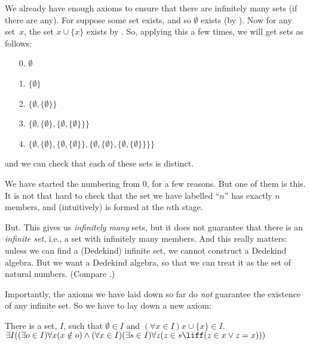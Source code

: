 \documentclass[../../../include/open-logic-section]{subfiles}
\begin{document}

We already have enough axioms to ensure that there are infinitely many
sets (if there are any). For suppose some set exists, and so
$\emptyset$ exists (by ). Now for
any set~$x$, the set $x \cup \{x\}$ exists by
. So, applying this a few
times, we will get sets as follows:
\begin{enumerate}
	\item[0.] $\emptyset$ %
	\item[1.] $ \{\emptyset\}$ %
	\item[2.] $\{\emptyset, \{\emptyset\}\}$ %
	\item[3.] $\{\emptyset, \{\emptyset\}, \{\emptyset, \{\emptyset\}\}\}$ %
	\item[4.] $\{\emptyset, \{\emptyset\}, \{\emptyset, \{\emptyset\}\}, \{\emptyset, \{\emptyset\}, \{\emptyset, \{\emptyset\}\}\}\}$%
\end{enumerate}
and we can check that each of these sets is distinct. 

We have started the numbering from $0$, for a few reasons. But one of
them is this. It is not that hard to check that the set we have
labelled ``$n$'' has exactly $n$ members, and (intuitively) is formed
at the $n$th stage. 

But. This gives us \emph{infinitely many} sets, but it does not
guarantee that there is an \emph{infinite set}, i.e., a set with
infinitely many members. And this really matters: unless we can find a
(Dedekind) infinite set, we cannot construct a Dedekind algebra. But
we want a Dedekind algebra, so that we can treat it as the set of
natural numbers. (Compare
.)

Importantly, the axioms we have laid down so far do \emph{not}
guarantee the existence of any infinite set. So we have to lay down a
new axiom:

\begin{axiom}[Infinity]
There is a set, $I$, such that $\emptyset \in I$ and $(\forall x \in I) x \cup \{x\} \in I$.\\
	$\exists I((\exists o \in I)\forall x(x \notin o) \land (\forall x \in I)(\exists s \in I)\forall z(z \in s \liff (z \in x \lor z = x)))$
\end{axiom}
\end{document}
